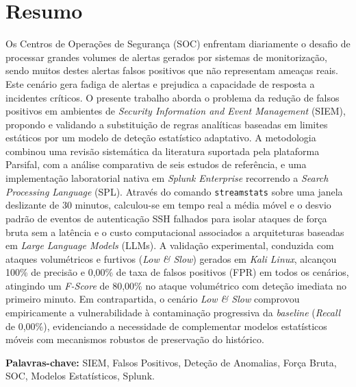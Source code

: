 \documentclass[12pt,a4paper]{article}
\begin{document}
\section*{Resumo}
Os Centros de Operações de Segurança (SOC) enfrentam diariamente o desafio de processar grandes volumes de alertas gerados por sistemas de monitorização, sendo muitos destes alertas falsos positivos que não representam ameaças reais. Este cenário gera fadiga de alertas e prejudica a capacidade de resposta a incidentes críticos. O presente trabalho aborda o problema da redução de falsos positivos em ambientes de \textit{Security Information and Event Management} (SIEM), propondo e validando a substituição de regras analíticas baseadas em limites estáticos por um modelo de deteção estatístico adaptativo. A metodologia combinou uma revisão sistemática da literatura suportada pela plataforma Parsifal, com a análise comparativa de seis estudos de referência, e uma implementação laboratorial nativa em \textit{Splunk Enterprise} recorrendo a \textit{Search Processing Language} (SPL). Através do comando \texttt{streamstats} sobre uma janela deslizante de 30 minutos, calculou-se em tempo real a média móvel e o desvio padrão de eventos de autenticação SSH falhados para isolar ataques de força bruta sem a latência e o custo computacional associados a arquiteturas baseadas em \textit{Large Language Models} (LLMs). A validação experimental, conduzida com ataques volumétricos e furtivos (\textit{Low \& Slow}) gerados em \textit{Kali Linux}, alcançou 100\% de precisão e 0,00\% de taxa de falsos positivos (FPR) em todos os cenários, atingindo um \textit{F-Score} de 80,00\% no ataque volumétrico com deteção imediata no primeiro minuto. Em contrapartida, o cenário \textit{Low \& Slow} comprovou empiricamente a vulnerabilidade à contaminação progressiva da \textit{baseline} (\textit{Recall} de 0,00\%), evidenciando a necessidade de complementar modelos estatísticos móveis com mecanismos robustos de preservação do histórico.

\vspace{1em}
\noindent\textbf{Palavras-chave:} SIEM, Falsos Positivos, Deteção de Anomalias, Força Bruta, SOC, Modelos Estatísticos, Splunk.

\newpage
\renewcommand{\contentsname}{Índice}
\tableofcontents

\vspace{1.5cm}
\newpage
{}
\renewcommand{\listfigurename}{Índice de Figuras}
\listoffigures
\end{document}
